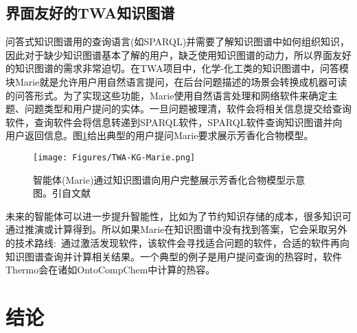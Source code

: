 \subsection{界面友好的\rm{TWA}知识图谱}
问答式知识图谱用的查询语言(如\textrm{SPARQL})并需要了解知识图谱中如何组织知识，因此对于缺少知识图谱基本了解的用户，缺乏使用知识图谱的动力，所以界面友好的知识图谱的需求非常迫切。在\textrm{TWA}项目中，化学-化工类的知识图谱中，问答模块\textrm{Marie}就是允许用户用自然语言提问，在后台问题描述的场景会转换成机器可读的问答形式。为了实现这些功能，\textrm{Marie}使用自然语言处理和网络软件来确定主题、问题类型和用户提问的实体。一旦问题被理清，软件会将相关信息提交给查询软件，查询软件会将信息转递到\textrm{SPARQL}软件，\textrm{SPARQL}软件查询知识图谱并向用户返回信息。图\ref{Fig:TWA-KG-Marie}给出典型的用户提问\textrm{Marie}要求展示芳香化合物模型。
\begin{figure}[h!]
\centering
\texttt{[image: Figures/TWA-KG-Marie.png]}
\caption{\small\textrm{智能体(Marie)通过知识图谱向用户完整展示芳香化合物模型示意图。引自文献~\cite{ACR56-128_2023}}}%
\label{Fig:TWA-KG-Marie}
\end{figure}
未来的智能体可以进一步提升智能性，比如为了节约知识存储的成本，很多知识可通过推演或计算得到。所以如果\textrm{Marie}在知识图谱中没有找到答案，它会采取另外的技术路线:~通过激活发现软件，该软件会寻找适合问题的软件，合适的软件再向知识图谱查询并计算相关结果。一个典型的例子是用户提问查询的热容时，软件\textrm{Thermo}会在诸如\textrm{OntoCompChem}中计算的热容。

\section{结论}


